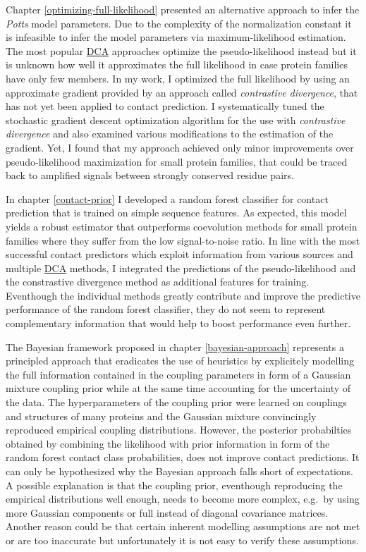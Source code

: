 \documentclass[11pt,a4paper,twoside]{book}
\theoremstyle{definition}
\theoremstyle{definition}
\theoremstyle{remark}
\begin{document}
Chapter \ref{optimizing-full-likelihood} presented an alternative
approach to infer the \emph{Potts} model parameters. Due to the
complexity of the normalization constant it is infeasible to infer the
model parameters via maximum-likelihood estimation. The most popular
\protect\hyperlink{abbrev}{DCA} approaches optimize the
pseudo-likelihood instead but it is unknown how well it approximates the
full likelihood in case protein families have only few members. In my
work, I optimized the full likelihood by using an approximate gradient
provided by an approach called \emph{contrastive divergence}, that has
not yet been applied to contact prediction. I systematically tuned the
stochastic gradient descent optimization algorithm for the use with
\emph{contrastive divergence} and also examined various modifications to
the estimation of the gradient. Yet, I found that my approach achieved
only minor improvements over pseudo-likelihood maximization for small
protein families, that could be traced back to amplified signals between
strongly conserved residue pairs.

In chapter \ref{contact-prior} I developed a random forest classifier
for contact prediction that is trained on simple sequence features. As
expected, this model yields a robust estimator that outperforms
coevolution methods for small protein families where they suffer from
the low signal-to-noise ratio. In line with the most successful contact
predictors which exploit information from various sources and multiple
\protect\hyperlink{abbrev}{DCA} methods, I integrated the predictions of
the pseudo-likelihood and the constrastive divergence method as
additional features for training. Eventhough the individual methods
greatly contribute and improve the predictive performance of the random
forest classifier, they do not seem to represent complementary
information that would help to boost performance even further.

The Bayesian framework proposed in chapter \ref{bayesian-approach}
represents a principled approach that eradicates the use of heuristics
by explicitely modelling the full information contained in the coupling
parameters in form of a Gaussian mixture coupling prior while at the
same time accounting for the uncertainty of the data. The
hyperparameters of the coupling prior were learned on couplings and
structures of many proteins and the Gaussian mixture convincingly
reproduced empirical coupling distributions. However, the posterior
probabilties obtained by combining the likelihood with prior information
in form of the random forest contact class probabilities, does not
improve contact predictions. It can only be hypothesized why the
Bayesian approach falls short of expectations. A possible explanation is
that the coupling prior, eventhough reproducing the empirical
distributions well enough, needs to become more complex, e.g.~by using
more Gaussian components or full instead of diagonal covariance
matrices. Another reason could be that certain inherent modelling
assumptions are not met or are too inaccurate but unfortunately it is
not easy to verify these assumptions.
\end{document}
